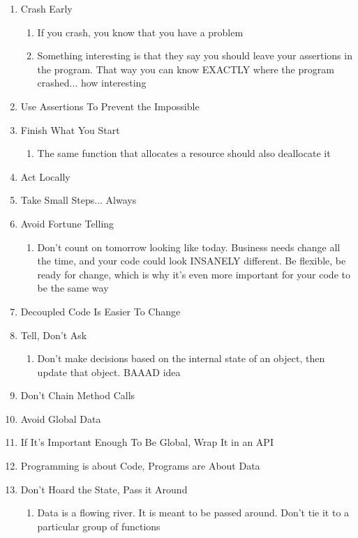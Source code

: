 \documentclass{article}
\begin{document}
\begin{enumerate}
    \item Crash Early
        \begin{enumerate}
            \item If you crash, you know that you have a problem
            \item Something interesting is that they say you should leave your assertions in the program. That way you can know EXACTLY where the program crashed... how interesting
        \end{enumerate}
        \item Use Assertions To Prevent the Impossible
    \item Finish What You Start
        \begin{enumerate}
            \item The same function that allocates a resource should also deallocate it
        \end{enumerate}
    \item Act Locally
    \item Take Small Steps... Always
    \item Avoid Fortune Telling
        \begin{enumerate}
            \item Don't count on tomorrow looking like today. Business needs change all the time, and your code could look INSANELY different. Be flexible, be ready for change, which is why it's even more important for your code to be the same way
        \end{enumerate}
    \item Decoupled Code Is Easier To Change
    \item Tell, Don't Ask
        \begin{enumerate}
            \item Don't make decisions based on the internal state of an object, then update that object. BAAAD idea
        \end{enumerate}
    \item Don't Chain Method Calls
    \item Avoid Global Data
    \item If It's Important Enough To Be Global, Wrap It in an API
    \item Programming is about Code, Programs are About Data
    \item Don't Hoard the State, Pass it Around
        \begin{enumerate}
            \item Data is a flowing river. It is meant to be passed around. Don't tie it to a particular group of functions

\end{enumerate}
\end{enumerate}
\end{document}
